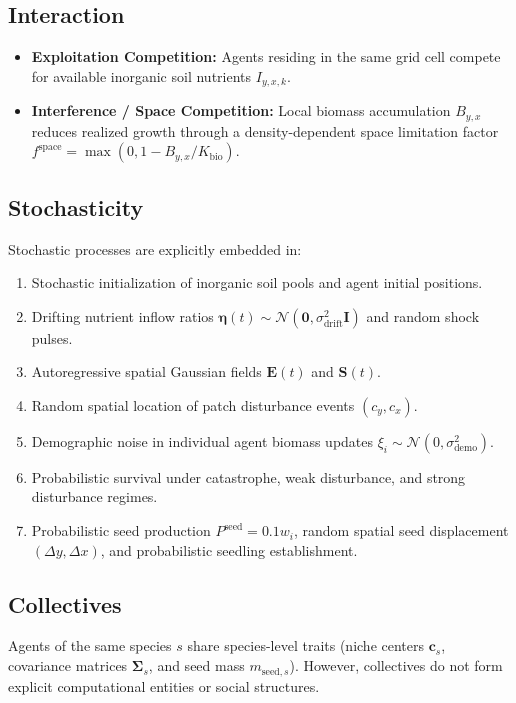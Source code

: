 \documentclass[11pt,a4paper]{article}
\begin{document}
\subsection{Interaction}
\begin{itemize}
    \item \textbf{Exploitation Competition:} Agents residing in the same grid cell compete for available inorganic soil nutrients $I_{y,x,k}$.
    \item \textbf{Interference / Space Competition:} Local biomass accumulation $B_{y,x}$ reduces realized growth through a density-dependent space limitation factor $f^{\text{space}} = \max(0, 1 - B_{y,x}/K_{\text{bio}})$.
\end{itemize}

\subsection{Stochasticity}
Stochastic processes are explicitly embedded in:
\begin{enumerate}
    \item Stochastic initialization of inorganic soil pools and agent initial positions.
    \item Drifting nutrient inflow ratios $\boldsymbol{\eta}(t) \sim \mathcal{N}(\boldsymbol{0}, \sigma_{\text{drift}}^2 \mathbf{I})$ and random shock pulses.
    \item Autoregressive spatial Gaussian fields $\mathbf{E}(t)$ and $\mathbf{S}(t)$.
    \item Random spatial location of patch disturbance events $(c_y, c_x)$.
    \item Demographic noise in individual agent biomass updates $\xi_i \sim \mathcal{N}(0, \sigma_{\text{demo}}^2)$.
    \item Probabilistic survival under catastrophe, weak disturbance, and strong disturbance regimes.
    \item Probabilistic seed production $P^{\text{seed}} = 0.1 w_i$, random spatial seed displacement $(\Delta y, \Delta x)$, and probabilistic seedling establishment.
\end{enumerate}

\subsection{Collectives}
Agents of the same species $s$ share species-level traits (niche centers $\boldsymbol{c}_s$, covariance matrices $\boldsymbol{\Sigma}_s$, and seed mass $m_{\text{seed}, s}$). However, collectives do not form explicit computational entities or social structures.
\end{document}

